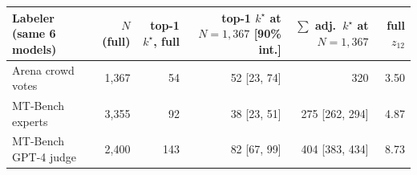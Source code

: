 \begin{tabular}{lrrrrr}
\toprule
Labeler (same 6 models) & $N$ (full) & top-1 $k^\star$, full & top-1 $k^\star$ at $N{=}1{,}367$ [90\% int.] & $\sum$ adj.\ $k^\star$ at $N{=}1{,}367$ & full $z_{12}$ \\
\midrule
Arena crowd votes & 1,367 & 54 & 52 [23, 74] & 320 & 3.50 \\
MT-Bench experts & 3,355 & 92 & 38 [23, 51] & 275 [262, 294] & 4.87 \\
MT-Bench GPT-4 judge & 2,400 & 143 & 82 [67, 99] & 404 [383, 434] & 8.73 \\
\bottomrule
\end{tabular}
